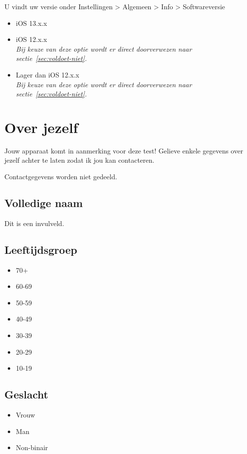 U vindt uw versie onder Instellingen > Algemeen > Info > Softwareversie

\begin{itemize}
    \item iOS 13.x.x
    \item iOS 12.x.x \\ \textit{Bij keuze van deze optie wordt er direct doorverwezen naar sectie~\ref{sec:voldoet-niet}.}
    \item Lager dan iOS 12.x.x \\ \textit{Bij keuze van deze optie wordt er direct doorverwezen naar sectie~\ref{sec:voldoet-niet}.}
\end{itemize}

\section{Over jezelf}

Jouw apparaat komt in aanmerking voor deze test! Gelieve enkele gegevens over jezelf achter te laten zodat ik jou kan contacteren.

Contactgegevens worden niet gedeeld.

\subsection*{Volledige naam}

Dit is een invulveld.

\subsection*{Leeftijdsgroep}

\begin{itemize}
    \item 70+
    \item 60-69
    \item 50-59
    \item 40-49
    \item 30-39
    \item 20-29
    \item 10-19
\end{itemize}

\subsection*{Geslacht}

\begin{itemize}
    \item Vrouw
    \item Man
    \item Non-binair
\end{itemize}

